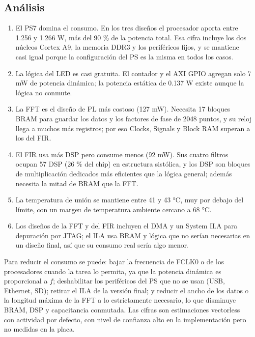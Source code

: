 \documentclass[11pt,a4paper]{article}
\begin{document}
\subsection{Análisis}
\begin{enumerate}
  \item El PS7 domina el consumo. En los tres diseños el procesador aporta entre 1.256 y 1.266 W, más del 90 \% de la potencia total. Esa cifra incluye los dos núcleos Cortex A9, la memoria DDR3 y los periféricos fijos, y se mantiene casi igual porque la configuración del PS es la misma en todos los casos.
  \item La lógica del LED es casi gratuita. El contador y el AXI GPIO agregan solo 7 mW de potencia dinámica; la potencia estática de 0.137 W existe aunque la lógica no conmute.
  \item La FFT es el diseño de PL más costoso (127 mW). Necesita 17 bloques BRAM para guardar los datos y los factores de fase de 2048 puntos, y su reloj llega a muchos más registros; por eso Clocks, Signals y Block RAM superan a los del FIR.
  \item El FIR usa más DSP pero consume menos (92 mW). Sus cuatro filtros ocupan 57 DSP (26 \% del chip) en estructura sistólica, y los DSP son bloques de multiplicación dedicados más eficientes que la lógica general; además necesita la mitad de BRAM que la FFT.
  \item La temperatura de unión se mantiene entre 41 y 43 °C, muy por debajo del límite, con un margen de temperatura ambiente cercano a 68 °C.
  \item Los diseños de la FFT y del FIR incluyen el DMA y un System ILA para depuración por JTAG; el ILA usa BRAM y lógica que no serían necesarias en un diseño final, así que su consumo real sería algo menor.
\end{enumerate}

Para reducir el consumo se puede: bajar la frecuencia de FCLK0 o de los procesadores cuando la tarea lo permita, ya que la potencia dinámica es proporcional a $f$; deshabilitar los periféricos del PS que no se usan (USB, Ethernet, SD); retirar el ILA de la versión final; y reducir el ancho de los datos o la longitud máxima de la FFT a lo estrictamente necesario, lo que disminuye BRAM, DSP y capacitancia conmutada. Las cifras son estimaciones vectorless con actividad por defecto, con nivel de confianza alto en la implementación pero no medidas en la placa.
\end{document}
